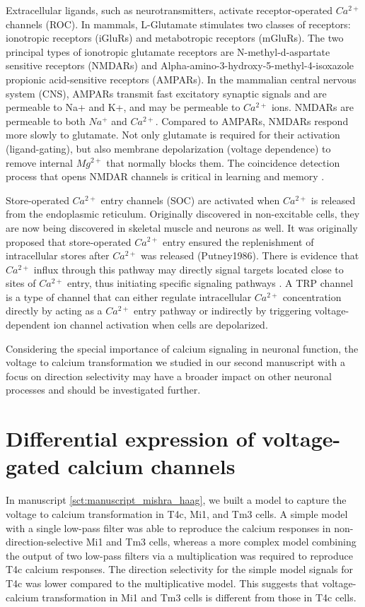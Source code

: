 Extracellular ligands, such as neurotransmitters, activate receptor-operated $Ca^{2+}$ channels (ROC). In mammals, L-Glutamate stimulates two classes of receptors: ionotropic receptors (iGluRs) and metabotropic receptors (mGluRs). The two principal types of ionotropic glutamate receptors are N-methyl-d-aspartate sensitive receptors (NMDARs) and Alpha-amino-3-hydroxy-5-methyl-4-isoxazole propionic acid-sensitive receptors (AMPARs). In the mammalian central nervous system (CNS), AMPARs transmit fast excitatory synaptic signals and are permeable to Na+ and K+, and may be permeable to $Ca^{2+}$ ions. NMDARs are permeable to both $Na^{+}$ and $Ca^{2+}$. Compared to AMPARs, NMDARs respond more slowly to glutamate. Not only glutamate is required for their activation (ligand-gating), but also membrane depolarization (voltage dependence) to remove internal $Mg^{2+}$ that normally blocks them. The coincidence detection process that opens NMDAR channels is critical in learning and memory \parencite{Miyashita2012}.

Store-operated $Ca^{2+}$ entry channels (SOC) are activated when $Ca^{2+}$ is released from the endoplasmic reticulum. Originally discovered in non-excitable cells, they are now being discovered in skeletal muscle and neurons as well. It was originally proposed that store-operated $Ca^{2+}$ entry ensured the replenishment of intracellular stores after $Ca^{2+}$ was released (Putney1986). There is evidence that $Ca^{2+}$ influx through this pathway may directly signal targets located close to sites of $Ca^{2+}$ entry, thus initiating specific signaling pathways \parencite{Feske2011}. 
A TRP channel is a type of channel that can either regulate intracellular $Ca^{2+}$ concentration directly by acting as a $Ca^{2+}$ entry pathway or indirectly by triggering voltage-dependent ion channel activation when cells are depolarized.

Considering the special importance of calcium signaling in neuronal function, the voltage to calcium transformation we studied in our second manuscript with a focus on direction selectivity may have a broader impact on other neuronal processes and should be investigated further.

\section{Differential expression of voltage-gated calcium channels}

In manuscript \ref{sct:manuscript_mishra_haag}, we built a model to capture the voltage to calcium transformation in T4c, Mi1, and Tm3 cells. A simple model with a single low-pass filter was able to reproduce the calcium responses in non-direction-selective Mi1 and Tm3 cells, whereas a more complex model combining the output of two low-pass filters via a multiplication was required to reproduce T4c calcium responses. The direction selectivity for the simple model signals for T4c was lower compared to the multiplicative model. This suggests that voltage-calcium transformation in Mi1 and Tm3 cells is different from those in T4c cells. 

